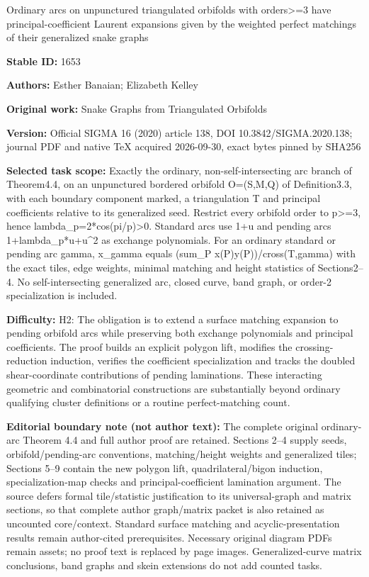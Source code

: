 \documentclass[11pt]{article}
\numberwithin{equation}{section}
\begin{document}
\begin{center}\Large Ordinary arcs on unpunctured triangulated orbifolds with orders>=3 have principal-coefficient Laurent expansions given by the weighted perfect matchings of their generalized snake graphs\end{center}
\noindent\textbf{Stable ID:} 1653\par
\noindent\textbf{Authors:} Esther Banaian; Elizabeth Kelley\par
\noindent\textbf{Original work:} Snake Graphs from Triangulated Orbifolds\par
\noindent\textbf{Version:} Official SIGMA 16 (2020) article 138, DOI 10.3842/SIGMA.2020.138; journal PDF and native TeX acquired 2026-09-30, exact bytes pinned by SHA256\par
\noindent\textbf{Selected task scope:} Exactly the ordinary, non-self-intersecting arc branch of Theorem4.4, on an unpunctured bordered orbifold O=(S,M,Q) of Definition3.3, with each boundary component marked, a triangulation T and principal coefficients relative to its generalized seed. Restrict every orbifold order to p>=3, hence lambda\_p=2*cos(pi/p)>0. Standard arcs use 1+u and pending arcs 1+lambda\_p*u+u\textasciicircum{}2 as exchange polynomials. For an ordinary standard or pending arc gamma, x\_gamma equals (sum\_P x(P)y(P))/cross(T,gamma) with the exact tiles, edge weights, minimal matching and height statistics of Sections2–4. No self-intersecting generalized arc, closed curve, band graph, or order-2 specialization is included.\par
\noindent\textbf{Difficulty:} H2: The obligation is to extend a surface matching expansion to pending orbifold arcs while preserving both exchange polynomials and principal coefficients. The proof builds an explicit polygon lift, modifies the crossing-reduction induction, verifies the coefficient specialization and tracks the doubled shear-coordinate contributions of pending laminations. These interacting geometric and combinatorial constructions are substantially beyond ordinary qualifying cluster definitions or a routine perfect-matching count.\par
\noindent\textbf{Editorial boundary note (not author text):} The complete original ordinary-arc Theorem 4.4 and full author proof are retained. Sections 2–4 supply seeds, orbifold/pending-arc conventions, matching/height weights and generalized tiles; Sections 5–9 contain the new polygon lift, quadrilateral/bigon induction, specialization-map checks and principal-coefficient lamination argument. The source defers formal tile/statistic justification to its universal-graph and matrix sections, so that complete author graph/matrix packet is also retained as uncounted core/context. Standard surface matching and acyclic-presentation results remain author-cited prerequisites. Necessary original diagram PDFs remain assets; no proof text is replaced by page images. Generalized-curve matrix conclusions, band graphs and skein extensions do not add counted tasks.\par
\end{document}
